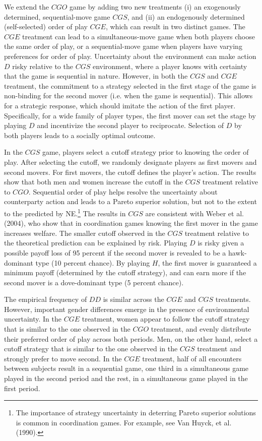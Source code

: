 \documentclass[11pt, letterpaper]{article}
\theoremstyle{plain}
\begin{document}
We extend the $CGO$ game by adding two new treatments (i) an exogenously determined, sequential-move game $CGS$, and (ii) an endogenously determined (self-selected) order of play $CGE$, which can result in two distinct games. The $CGE$ treatment can lead to a simultaneous-move game when both players choose the same order of play, or a sequential-move game when players have varying preferences for order of play. Uncertainty about the environment can make action $D$ risky relative to the $CGS$ environment, where a player knows with certainty that the game is sequential in nature. However, in both the $CGS$ and $CGE$ treatment, the commitment to a strategy selected in the first stage of the game is non-binding for the second mover (i.e. when the game is sequential). This allows for a strategic response, which should imitate the action of the first player. Specifically, for a wide family of player types, the first mover can set the stage by playing $D$ and incentivize the second player to reciprocate. Selection of $D$ by both players leads to a socially optimal outcome.

In the $CGS$ game, players select a cutoff strategy prior to knowing the order of play. After selecting the cutoff, we randomly designate players as first movers and second movers. For first movers, the cutoff defines the player's action. The results show that both men and women increase the cutoff in the $CGS$ treatment relative to $CGO$. Sequential order of play helps resolve the uncertainty about counterparty action and leads to a Pareto superior solution, but not to the extent to the predicted by NE.\footnote{The importance of strategy uncertainty in deterring Pareto superior solutions is common in coordination games. For example, see Van Huyck, et al. (1990).} The results in $CGS$ are consistent with Weber et al. (2004), who show that in coordination games knowing the first mover in the game increases welfare. The smaller cutoff observed in the $CGS$ treatment relative to the theoretical prediction can be explained by risk. Playing $D$ is risky given a possible payoff loss of 95 percent if the second mover is revealed to be a hawk-dominant type (10 percent chance). By playing $H$, the first mover is guaranteed a minimum payoff (determined by the cutoff strategy), and can earn more if the second mover is a dove-dominant type (5 percent chance).

The empirical frequency of $DD$ is similar across the $CGE$ and $CGS$ treatments. However, important gender differences emerge in the presence of environmental uncertainty. In the $CGE$ treatment, women appear to follow the cutoff strategy that is similar to the one observed in the $CGO$ treatment, and evenly distribute their preferred order of play across both periods. Men, on the other hand, select a cutoff strategy that is similar to the one observed in the $CGS$ treatment and strongly prefer to move second. In the $CGE$ treatment, half of all encounters between subjects result in a sequential game, one third in a simultaneous game played in the second period and the rest, in a simultaneous game played in the first period. 
\end{document}
